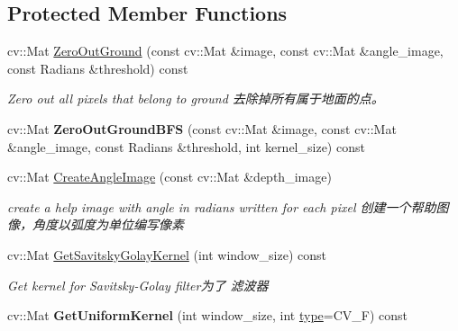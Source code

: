 \subsection*{Protected Member Functions}
\begin{DoxyCompactItemize}
\item 
cv\-::\-Mat \hyperlink{classdepth__clustering_1_1DepthGroundRemover_a0f3733c1cbc915600d255246b1dccce0}{Zero\-Out\-Ground} (const cv\-::\-Mat \&image, const cv\-::\-Mat \&angle\-\_\-image, const Radians \&threshold) const 
\begin{DoxyCompactList}\small\item\em Zero out all pixels that belong to ground 去除掉所有属于地面的点。 \end{DoxyCompactList}\item 
\hypertarget{classdepth__clustering_1_1DepthGroundRemover_a3364e716dc72e6dc2a5d37d6c670a235}{cv\-::\-Mat {\bfseries Zero\-Out\-Ground\-B\-F\-S} (const cv\-::\-Mat \&image, const cv\-::\-Mat \&angle\-\_\-image, const Radians \&threshold, int kernel\-\_\-size) const }\label{classdepth__clustering_1_1DepthGroundRemover_a3364e716dc72e6dc2a5d37d6c670a235}

\item 
cv\-::\-Mat \hyperlink{classdepth__clustering_1_1DepthGroundRemover_af533c51a44aad9a56c12445b61b801b9}{Create\-Angle\-Image} (const cv\-::\-Mat \&depth\-\_\-image)
\begin{DoxyCompactList}\small\item\em create a help image with angle in radians written for each pixel 创建一个帮助图像，角度以弧度为单位编写像素 \end{DoxyCompactList}\item 
cv\-::\-Mat \hyperlink{classdepth__clustering_1_1DepthGroundRemover_a8b660a1be94b529cf2554b8f72aee30d}{Get\-Savitsky\-Golay\-Kernel} (int window\-\_\-size) const 
\begin{DoxyCompactList}\small\item\em Get kernel for Savitsky-\/\-Golay filter为了 滤波器 \end{DoxyCompactList}\item 
\hypertarget{classdepth__clustering_1_1DepthGroundRemover_af3c60a97dd0cca8847e40c86ee11c037}{cv\-::\-Mat {\bfseries Get\-Uniform\-Kernel} (int window\-\_\-size, int \hyperlink{classdepth__clustering_1_1AbstractSender_ad9da304185f766eb4b0035d6610caa49}{type}=C\-V\-\_\-F) const }\label{classdepth__clustering_1_1DepthGroundRemover_af3c60a97dd0cca8847e40c86ee11c037}


\end{DoxyCompactItemize}
